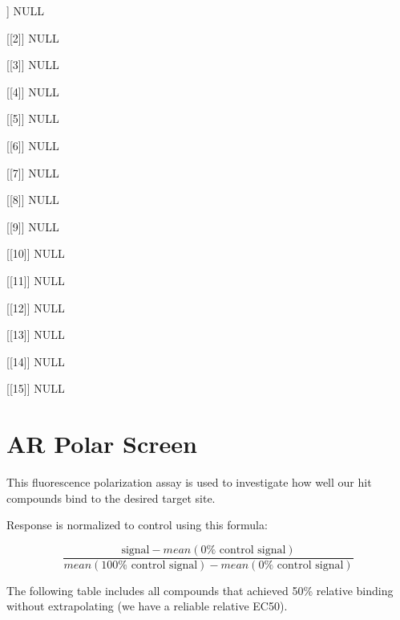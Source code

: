 \documentclass[
]{article}
\begin{document}
\newpage
[[1]

{]} NULL

{[}{[}2{]}{]} NULL

{[}{[}3{]}{]} NULL

{[}{[}4{]}{]} NULL

{[}{[}5{]}{]} NULL

{[}{[}6{]}{]} NULL

{[}{[}7{]}{]} NULL

{[}{[}8{]}{]} NULL

{[}{[}9{]}{]} NULL

{[}{[}10{]}{]} NULL

{[}{[}11{]}{]} NULL

{[}{[}12{]}{]} NULL

{[}{[}13{]}{]} NULL

{[}{[}14{]}{]} NULL

{[}{[}15{]}{]} NULL

\newpage

\section{AR Polar Screen}\label{ar-polar-screen}

This fluorescence polarization assay is used to investigate how well our
hit compounds bind to the desired target site.

Response is normalized to control using this formula:

\[
\frac{\text{signal} - mean(\text{0%
\]

The following table includes all compounds that achieved 50\% relative
binding without extrapolating (we have a reliable relative EC50).
\end{document}

